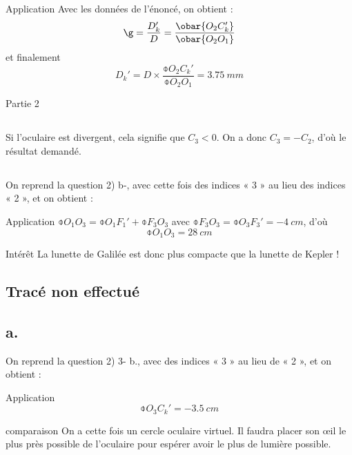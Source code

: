 \documentclass[10pt,notitlepage]{book}
\begin{document}
\begin{NCexem}{Application}
    Avec les données de l'énoncé, on obtient :
    \[ \g = \frac{D_k'}{D} = \frac{\obar{O_2C_k'}}{\obar{O_2O_1}}\]
    et finalement
    \[ \boxed{D_k' = D\times \frac{\obar{O_2C_k'}}{\obar{O_2O_1}} =
    \SI{3.75}{mm}} \]
\end{NCexem}

\begin{center}
    \huge Partie 2
\end{center}

\subsection{}
Si l'oculaire est divergent, cela signifie que $C_3 < 0$. On a donc $C_3 = -
C_2$, d'où le résultat demandé.

\subsection{}
On reprend la question 2) b-, avec cette fois des indices « 3 » au lieu des
indices « 2 », et on obtient :

\begin{NCexem}{Application}
    $\obar{O_1O_3} = \obar{O_1F_1'} + \obar{F_3O_3}$ avec $\obar{F_3O_3} =
    \obar{O_3F_3'} = \SI{-4}{cm}$, d'où
    \[ \boxed{\obar{O_1O_3} = \SI{+28}{cm}} \]
\end{NCexem}

\begin{inte}{Intérêt}
    La lunette de Galilée est donc plus compacte que la lunette de Kepler !
\end{inte}

\subsection{Tracé non effectué}

\subsection{a.}
On reprend la question 2) 3- b., avec des indices « 3 » au lieu de « 2 », et on
obtient :
\begin{NCexem}{Application}
    \[ \boxed{\obar{O_3C_k'} = \SI{-3.5}{cm}}\]
\end{NCexem}

\begin{rema}{comparaison}
    On a cette fois un cercle oculaire virtuel. Il faudra placer son œil le plus
    près possible de l'oculaire pour espérer avoir le plus de lumière possible.
\end{rema}
\end{document}
